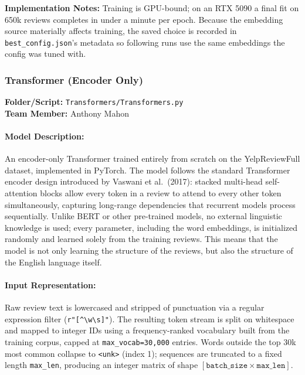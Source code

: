 \documentclass[12pt]{article}
\begin{document}
\textbf{Implementation Notes:} Training is GPU-bound; on an RTX 5090 a final fit on 650k reviews completes in under a minute per epoch. Because the embedding source materially affects training, the saved choice is recorded in \texttt{best\_config.json}'s metadata so following runs use the same embeddings the config was tuned with.

\subsubsection{Transformer (Encoder Only)}
\textbf{Folder/Script:} \texttt{Transformers/Transformers.py}\\
\textbf{Team Member:} Anthony Mahon
 
\paragraph{Model Description:}
An encoder-only Transformer trained entirely from scratch on the YelpReviewFull dataset, implemented in PyTorch. The model follows the standard Transformer encoder design introduced by Vaswani et al.\ (2017): stacked multi-head self-attention blocks allow every token in a review to attend to every other token simultaneously, capturing long-range dependencies that recurrent models process sequentially. Unlike BERT or other pre-trained models, no external linguistic knowledge is used; every parameter, including the word embeddings, is initialized randomly and learned solely from the training reviews. This means that the model is not only learning the structure of the reviews, but also the structure of the English language itself.
 
\paragraph{Input Representation:}
Raw review text is lowercased and stripped of punctuation via a regular expression filter (\texttt{r"[\^{}\textbackslash w\textbackslash s]"}). The resulting token stream is split on whitespace and mapped to integer IDs using a frequency-ranked vocabulary built from the training corpus, capped at \texttt{max\_vocab=30,000} entries. Words outside the top 30k most common collapse to \texttt{<unk>} (index 1); sequences are truncated to a fixed length \texttt{max\_len}, producing an integer matrix of shape $[\texttt{batch\_size} \times \texttt{max\_len}]$.
 
\end{document}
